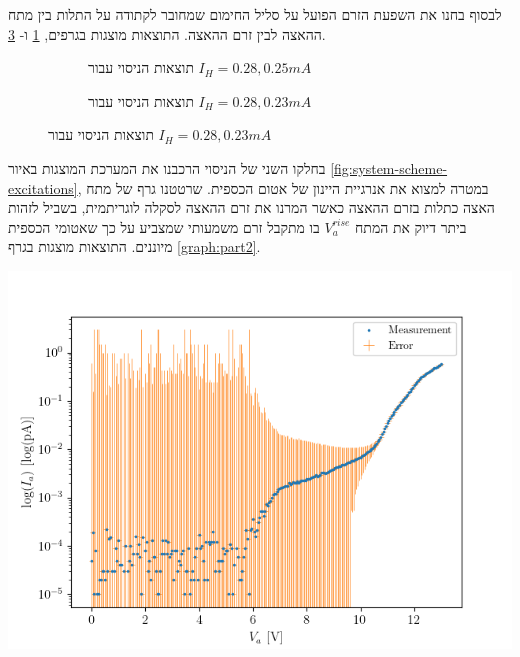 \documentclass{article}
\begin{document}
לבסוף בחנו את השפעת הזרם הפועל על סליל החימום שמחובר לקתודה על התלות בין מתח ההאצה לבין זרם ההאצה.
התוצאות מוצגות בגרפים,
\ref{fig:Changing_Ih_25-28mA}
ו-
\ref{fig:Changing_Ih_23-28mA}.

\begin{figure}[H]
    \begin{subfigure}[b]{\textwidth}
    	\centering
	\resizebox{0.8\textwidth}{!}{}
    	\caption{תוצאות הניסוי עבור 
    	$I_H =0.28,0.25 mA$}
    	\label{fig:Changing_Ih_25-28mA}
    \end{subfigure}
    \hfill
    \begin{subfigure}[b]{\textwidth}
    	\centering
    	\resizebox{0.8\textwidth}{!}{}
    	\caption{תוצאות הניסוי עבור 
    	$I_H =0.28,0.23 mA$}
    	\label{fig:Changing_Ih_23-28mA}
    \end{subfigure}
\end{figure}


בחלקו השני של הניסוי הרכבנו את המערכת המוצגות באיור
\ref{fig:system-scheme-excitations}, 
במטרה למצוא את אנרגיית היינון של אטום הכספית.
שרטטנו גרף של מתח האצה כתלות בזרם ההאצה כאשר המרנו את זרם ההאצה לסקלה לוגריתמית, בשביל לזהות ביתר דיוק את המתח
$V_a^{rise}$
בו מתקבל זרם משמעותי שמצביע על כך שאטומי הכספית מיוננים. התוצאות מוצגות בגרף
\ref{graph:part2}.

\begin{graph}[H]
	\begin{center}
	 \includegraphics[width=\textwidth]{partTwo.png}
	\end{center}
	\caption{תוצאות יינון אטומי כספית}
	\label{graph:part2}
\end{graph}
\end{document}
